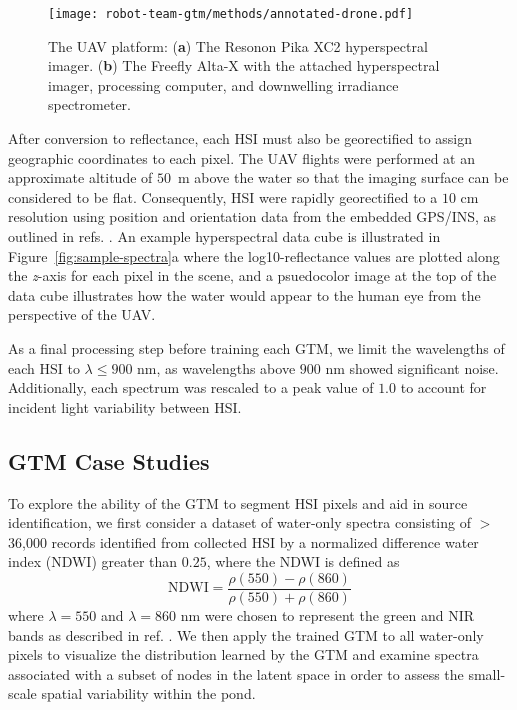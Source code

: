 \begin{figure}[H]
  \centering
  \texttt{[image: robot-team-gtm/methods/annotated-drone.pdf]}
  \caption{The UAV platform: (\textbf{a}) The Resonon Pika XC2 hyperspectral
    imager. (\textbf{b}) The Freefly Alta-X with the attached hyperspectral
    imager, processing computer, and downwelling irradiance
    spectrometer. \label{fig:drone}}
\end{figure}




After conversion to reflectance, each HSI must also be georectified to assign geographic coordinates to each pixel. The UAV flights were performed at an approximate altitude of $50$~m above the water so that the imaging surface can be considered to be flat. Consequently, HSI were rapidly georectified to a $10$ cm resolution using position and orientation data from the embedded GPS/INS, as outlined in refs. \cite{muller2002program, baumker2001new, mostafa2000multi}. An example hyperspectral data cube is illustrated in Figure~\ref{fig:sample-spectra}a  where the log10-reflectance values are plotted along the \emph{z}-axis for each pixel in the scene, and a psuedocolor image at the top of the data cube illustrates how the water would appear to the human eye from the perspective of the UAV.

As a final processing step before training each GTM, we limit the wavelengths of each HSI to $\lambda \leq 900$ nm, as wavelengths above $900$ nm showed significant noise. Additionally, each spectrum was rescaled to a peak value of $1.0$ to account for incident light variability between HSI.

\subsection{GTM Case Studies}\label{sec:case-studies}

To explore the ability of the GTM to segment HSI pixels and aid in source identification, we first consider a dataset of water-only spectra consisting of $>$36,000 records identified from collected HSI by a normalized difference water index (NDWI) greater than $0.25$, where the NDWI is defined as
\begin{equation}
    \text{NDWI} = \dfrac{\rho(550) - \rho(860)}{\rho(550) + \rho(860)}
\end{equation}
where $\lambda=550$ and $\lambda=860$ nm were chosen to represent the green and NIR bands as described in ref. \cite{ndwi}. We then apply the trained GTM to all water-only pixels to visualize the distribution learned by the GTM and examine spectra associated with a subset of nodes in the latent space in order to assess the small-scale spatial variability within the pond.

